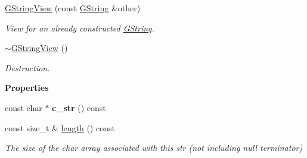 \begin{Indent}
\begin{DoxyCompactItemize}
\mbox{\label{classrev_1_1_g_string_view_ae53b0708413bf9b94296dd7fc120bec2}} 
\mbox{\hyperlink{classrev_1_1_g_string_view_ae53b0708413bf9b94296dd7fc120bec2}{G\+String\+View}} (const \mbox{\hyperlink{classrev_1_1_g_string}{G\+String}} \&other)
\begin{DoxyCompactList}\small\item\em View for an already constructed \mbox{\hyperlink{classrev_1_1_g_string}{G\+String}}. \end{DoxyCompactList}\item 
\mbox{\label{classrev_1_1_g_string_view_a5dc3037ad67d61dc78281c6870ee6363}} 
\mbox{\hyperlink{classrev_1_1_g_string_view_a5dc3037ad67d61dc78281c6870ee6363}{$\sim$\+G\+String\+View}} ()
\begin{DoxyCompactList}\small\item\em Destruction. \end{DoxyCompactList}\end{DoxyCompactItemize}
\end{Indent}
\begin{Indent}\textbf{ Properties}\par
\begin{DoxyCompactItemize}
\item 
\mbox{\label{classrev_1_1_g_string_view_af89063feaa4c5985c4eabe6ddca175ce}} 
const char $\ast$ {\bfseries c\+\_\+str} () const
\item 
\mbox{\label{classrev_1_1_g_string_view_a562ab3a4b72edbd4319a4c8910ab8fab}} 
const size\+\_\+t \& \mbox{\hyperlink{classrev_1_1_g_string_view_a562ab3a4b72edbd4319a4c8910ab8fab}{length}} () const
\begin{DoxyCompactList}\small\item\em The size of the char array associated with this str (not including null terminator) \end{DoxyCompactList}\end{DoxyCompactItemize}
\end{Indent}
